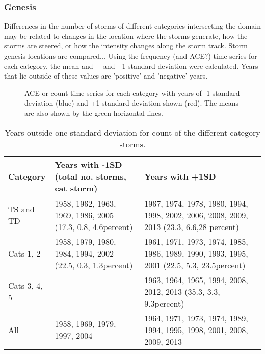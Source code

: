\subsubsection{Genesis}

Differences in the number of storms of different categories intersecting the domain may be related to changes in the location where the storms generate, how the storms are steered, or how the intensity changes along the storm track. Storm genesis locations are compared...
Using the frequency (and ACE?) time series for each category, the mean and + and - 1 standard deviation were calculated. Years that lie outside of these values are 'positive' and 'negative' years.


\begin{figure}
	\centering
	\caption{ACE or count time series for each category with years of -1 standard deviation (blue) and +1 standard deviation shown (red). The means are also shown by the green horizontal lines.} \label{fig:SD} 
\end{figure} 


\begin{table}[h]
	\caption{Years outside one standard deviation for count of the different category storms.}\label{tSD}
	\begin{center}
		\begin{tabular}{| m{2.5cm} | m{4.5cm}| m{6cm} |}
			\hline
			Category & Years with -1SD (total no. storms, cat storm)& Years with +1SD \\
			\hline\hline
			TS and TD & 1958, 1962, 1963, 1969, 1986, 2005 (17.3, 0.8, 4.6percent)& 1967, 1974, 1978, 1980, 1994, 1998, 2002, 2006, 2008, 2009, 2013 (23.3, 6.6,28 percent) \\ 
			Cats 1, 2 & 1958, 1979, 1980, 1984, 1994, 2002 (22.5, 0.3, 1.3percent)& 1961, 1971, 1973, 1974, 1985, 1986, 1989, 1990, 1993, 1995, 2001  (22.5, 5.3, 23.5percent)\\ 
			Cats 3, 4, 5 & - & 1963, 1964, 1965, 1994, 2008, 2012, 2013 (35.3, 3.3, 9.3percent) \\ 
			All & 1958, 1969, 1979, 1997, 2004 & 1964, 1971, 1973, 1974, 1989, 1994, 1995, 1998, 2001, 2008, 2009, 2013  \\ 
						
			\hline
		\end{tabular}
	\end{center}
\end{table}

